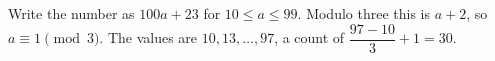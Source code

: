 Write the number as $100a+23$ for $10\le a\le99$. Modulo three this is $a+2$, so $a\equiv1\pmod3$. The values are $10,13,\ldots,97$, a count of $\dfrac{97-10}{3}+1=\boxed{30}$.
